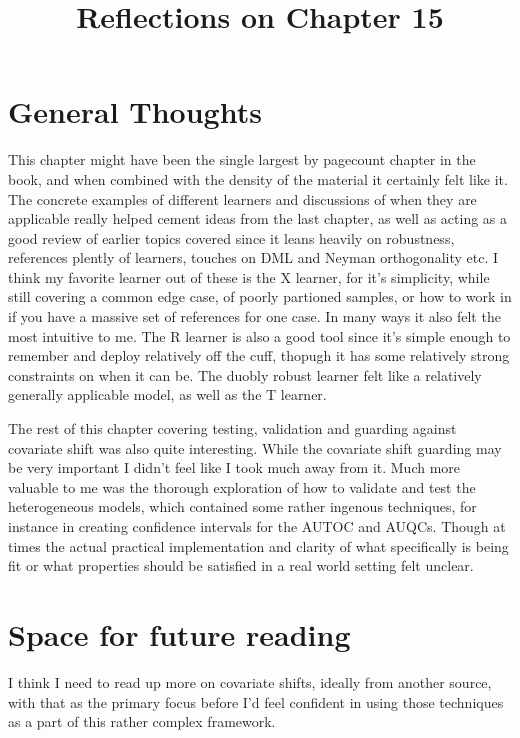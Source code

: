 \documentclass[10pt, english]{article}
\begin{document}
\title{Reflections on Chapter 15}
\date{}
\author{}

\maketitle


\section*{General Thoughts}
This chapter might have been the single largest by pagecount chapter in the book, and when combined with the density of the material it certainly felt like it. The concrete examples of different learners and discussions of when they are
applicable really helped cement ideas from the last chapter, as well as acting as a good review of earlier topics covered since it leans heavily on robustness, references plently of learners, touches on DML and Neyman orthogonality etc. 
I think my favorite learner out of these is the X learner, for it's simplicity, while still covering a common edge case, of poorly partioned samples, or how to work in if you have a massive set of references for one case. In many ways it 
also felt the most intuitive to me. The R learner is also a good tool since it's simple enough to remember and deploy relatively off the cuff, thopugh it has some relatively strong constraints on when it can be. The duobly robust learner felt
like a relatively generally applicable model, as well as the T learner. 

The rest of this chapter covering testing, validation and guarding against covariate shift was also quite interesting. While the covariate shift guarding may be very important I didn't feel like I took much away from it. Much more 
valuable to me was the thorough exploration of how to validate and test the heterogeneous models, which contained some rather ingenous techniques, for instance in creating confidence intervals for the AUTOC and AUQCs. Though at times
the actual practical implementation and clarity of what specifically is being fit or what properties should be satisfied in a real world setting felt unclear.

\section*{Space for future reading}
I think I need to read up more on covariate shifts, ideally from another source, with that as the primary focus before I'd feel confident in using those techniques as a part of this rather complex framework.
\end{document}
